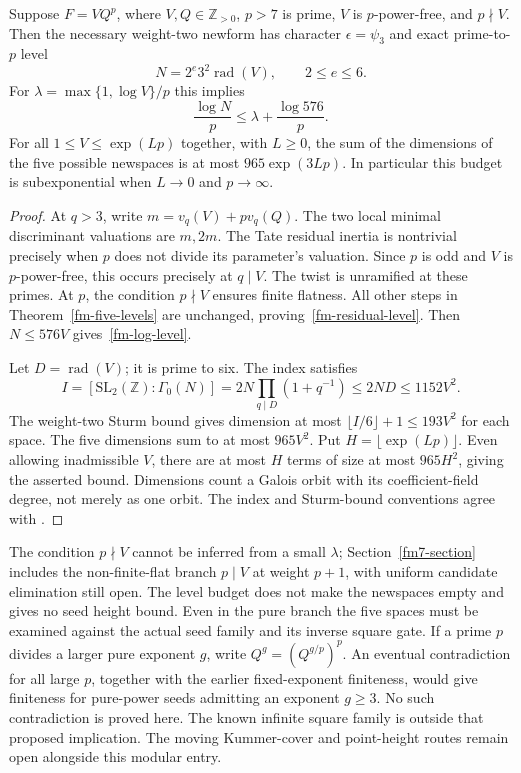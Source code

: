 \begin{theorem}\label{fm-residual-budget}
Suppose $F=VQ^p$, where $V,Q\in\mathbb Z_{>0}$, $p>7$ is prime,
$V$ is $p$-power-free, and
$p\nmid V$. Then the necessary weight-two newform has character
$\epsilon=\psi_3$ and exact prime-to-$p$ level
\begin{equation}\label{fm-residual-level}
 N=2^e3^2\operatorname{rad}(V),\qquad2\le e\le6.
\end{equation}
For $\lambda=\max\{1,\log V\}/p$ this implies
\begin{equation}\label{fm-log-level}
 \frac{\log N}{p}\le\lambda+\frac{\log576}{p}.
\end{equation}
For all $1\le V\le\exp(Lp)$ together, with $L\ge0$, the sum of the
dimensions of the five possible newspaces is at most
$965\exp(3Lp)$. In particular this budget is subexponential when
$L\to0$ and $p\to\infty$.
\end{theorem}
\begin{proof}
At $q>3$, write $m=v_q(V)+p v_q(Q)$. The two local minimal discriminant
valuations are $m,2m$. The Tate residual inertia is nontrivial precisely
when $p$ does not divide its parameter's valuation. Since $p$ is odd and
$V$ is $p$-power-free, this occurs precisely at $q\mid V$.
The twist is unramified at these primes. At $p$, the condition $p\nmid V$
ensures finite flatness. All other steps in Theorem~\ref{fm-five-levels}
are unchanged, proving~\eqref{fm-residual-level}.
Then $N\le576V$ gives~\eqref{fm-log-level}.

Let $D=\operatorname{rad}(V)$; it is prime to six. The index satisfies
\[
 I=[\mathrm{SL}_2(\mathbb Z):\Gamma_0(N)]
  =2N\prod_{q\mid D}(1+q^{-1})
  \le2ND\le1152V^2.
\]
The weight-two Sturm bound gives dimension at most
$\lfloor I/6\rfloor+1\le193V^2$ for each space. The five dimensions
sum to at most $965V^2$. Put $H=\lfloor\exp(Lp)\rfloor$.
Even allowing inadmissible $V$, there are at most $H$ terms of size at
most $965H^2$, giving the asserted bound. Dimensions count a Galois
orbit with its coefficient-field degree, not merely as one orbit.
The index and Sturm-bound conventions agree with
\cite[\texttt{mfsturm}]{PARIModularForms}.
\end{proof}

The condition $p\nmid V$ cannot be inferred from a small $\lambda$;
Section~\ref{fm7-section} includes the non-finite-flat branch $p\mid V$
at weight $p+1$, with uniform candidate elimination still open.
The level budget does not make the newspaces empty and gives no seed
height bound. Even in the pure branch the five spaces must be examined
against the actual seed family and its inverse square gate.
If a prime $p$ divides a larger pure exponent $g$, write
$Q^g=(Q^{g/p})^p$. An eventual contradiction for all large $p$, together
with the earlier fixed-exponent finiteness, would give finiteness for
pure-power seeds admitting an exponent $g\ge3$. No such contradiction
is proved here. The known infinite square family is outside that
proposed implication. The moving Kummer-cover and point-height routes
remain open alongside this modular entry.
